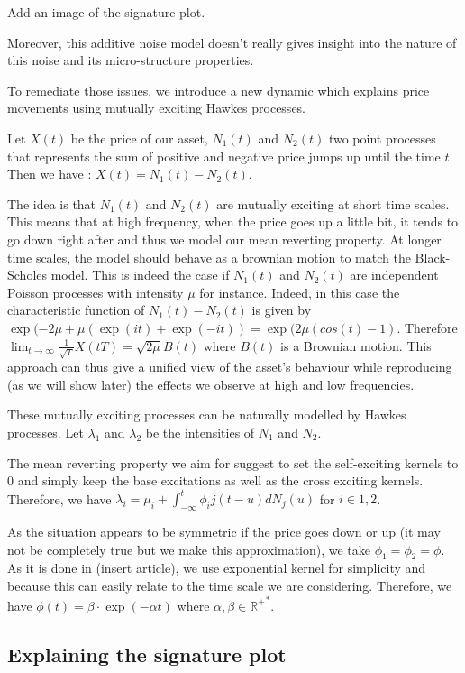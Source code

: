 \documentclass[a4paper,12pt,twoside]{article}
\begin{document}
Add an image of the signature plot.

Moreover, this additive noise model doesn't really gives insight into the nature of this noise and its micro-structure properties. 

To remediate those issues, we introduce a new dynamic which explains price movements using mutually exciting Hawkes processes.

Let $X(t)$ be the price of our asset, $N_1(t)$ and $N_2(t)$ two point processes that represents the sum of positive and negative price jumps up until the time $t$. Then we have : $X(t) = N_1(t) - N_2(t)$. 

The idea is that $N_1(t)$ and $N_2(t)$ are mutually exciting at short time scales. This means that at high frequency, when the price goes up a little bit, it tends to go down right after and thus we model our mean reverting property. At longer time scales, the model should behave as a brownian motion to match the Black-Scholes model. This is indeed the case if $N_1(t)$ and $N_2(t)$ are independent Poisson processes with intensity $\mu$ for instance.
Indeed, in this case the characteristic function of $N_1(t) - N_2(t)$ is given by $\exp(-2\mu + \mu(\exp(it) + \exp(-it)) = \exp(2\mu(cos(t) - 1)$. Therefore $\lim_{t \to \infty} \frac{1}{\sqrt{T}}X(tT) = \sqrt{2\mu}B(t)$ where $B(t)$ is a Brownian motion.
This approach can thus give a unified view of the asset's behaviour while reproducing (as we will show later) the effects we observe at high and low frequencies.

These mutually exciting processes can be naturally modelled by Hawkes processes. Let $\lambda_1$ and $\lambda_2$ be the intensities of $N_1$ and $N_2$. 

The mean reverting property we aim for suggest to set the self-exciting kernels to 0 and simply keep the base excitations as well as the cross exciting kernels. Therefore, we have $\lambda_i = \mu_i + \int_{-\infty}^{t} \phi_ij(t-u)dN_j(u)$ for $i \in {1, 2}$.

As the situation appears to be symmetric if the price goes down or up (it may not be completely true but we make this approximation), we take $\phi_1 = \phi_2 = \phi$. As it is done in (insert article), we use exponential kernel for simplicity and because this can easily relate to the time scale we are considering. Therefore, we have $\phi(t) = \beta \cdot \exp(-\alpha t)$ where $\alpha, \beta \in \mathbb{{R^{+}}^*}$.



\subsection{Explaining the signature plot}
\end{document}
